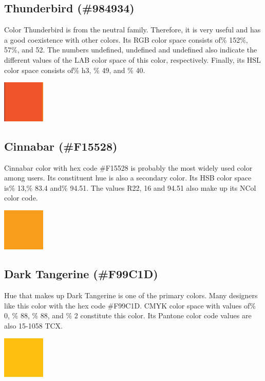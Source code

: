 \documentclass[12pt,titlepage,a4paper]{report}
\begin{document}
    \subsection*{Thunderbird (\#984934)}
    Color Thunderbird is from the neutral family. Therefore, it is very useful and has a good coexistence with other colors. Its RGB color space consists of\% 152\%, 57\%, and 52. The numbers undefined, undefined and undefined also indicate the different values of the LAB color space of this color, respectively. Finally, its HSL color space consists of\% h3, \% 49, and \% 40.
    \begin{center}
        \includegraphics[width=2cm]{images/figures/UIUX/Untitled 2.png}
    \end{center}
    \subsection*{Cinnabar (\#F15528)}
    Cinnabar color with hex code \#F15528 is probably the most widely used color among users. Its constituent hue is also a secondary color. Its HSB color space is\% 13,\% 83.4 and\% 94.51. The values R22, 16 and 94.51 also make up its NCol color code.
    \begin{center}
        \includegraphics[width=2cm]{images/figures/UIUX/Untitled 3.png}
    \end{center}
    \subsection*{Dark Tangerine (\#F99C1D)}
    Hue that makes up Dark Tangerine is one of the primary colors. Many designers like this color with the hex code \#F99C1D. CMYK color space with values of\% 0, \% 88, \% 88, and \% 2 constitute this color. Its Pantone color code values are also 15-1058 TCX.
    \begin{center}
        \includegraphics[width=2cm]{images/figures/UIUX/Untitled 4.png}
    \end{center}
\end{document}
